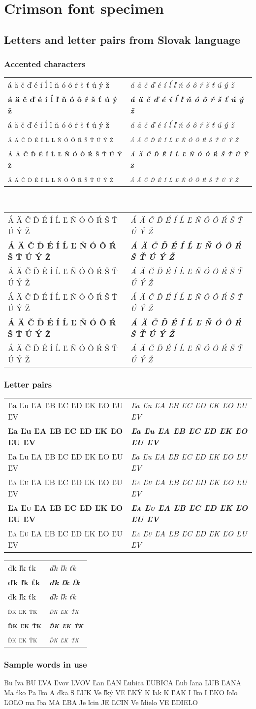 ﻿\documentclass[12pt,a4paper,twoside]{article}
\makeatletter
\def\kernpairsLcaron{Ľa Ľu ĽA ĽB ĽC ĽD ĽK ĽO ĽU ĽV}
\def\kernpairsdltcaron{ďk ľk ťk}
\def\slovakaccentedalpha{á ä č ď é í ĺ ľ ň ó ô ŕ š ť ú ý ž}
\def\slovakaccentedAlpha{Á Ä Č Ď É Í Ĺ Ľ Ň Ó Ô Ŕ Š Ť Ú Ý Ž}
\newcommand\testallweights[1]{\begin{tabular}{@{}l@{\enskip}l@{}}
#1 & \textit{#1}\\
\textbf{#1} & \textit{\textbf{#1}}\\
{\crimsonbold #1} & {\crimsonbold\textit{#1}}\\
\textsc{#1} & \textsc{\textit{#1}}\\
\textsc{\textbf{#1}} & \textsc{\textit{\textbf{#1}}}\\
\textsc{\crimsonbold #1} & \textsc{\crimsonbold\textit{#1}}\\
\end{tabular}}
\newcommand{\red}[1]{{\color{red} #1}}
\makeatother
\begin{document}
\section{Crimson font specimen}
\subsection{Letters and letter pairs from Slovak language}
\subsubsection{Accented characters}
\begin{slovak}
\testallweights{\slovakaccentedalpha}\\
\testallweights{\slovakaccentedAlpha}
\subsubsection{Letter pairs}
\testallweights{\kernpairsLcaron}
\testallweights{\kernpairsdltcaron}
\subsubsection{Sample words in use}
Bu\red{ľv}a BU\red{ĽV}A \red{Ľv}ov \red{ĽV}OV \red{Ľa}n \red{ĽA}N \red{Ľu}bica \red{ĽU}BICA \red{Ľu}b\red{ľa}na \red{ĽU}B\red{ĽA}NA Ma\red{ťk}o Pa\red{ľk}o A\red{ďk}a S\red{ĽU}K Ve\red{ľk}ý VE\red{ĽK}Ý K\red{ľa}k K\red{ĽA}K I\red{ľk}o I\red{ĽK}O \red{ľo}ľo \red{ĽO}ĽO ma\red{ľb}a MA\red{ĽB}A Je\red{ľc}in JE\red{ĽC}IN Ve\red{ľd}ielo VE\red{ĽD}IELO
\end{slovak}
\end{document}
